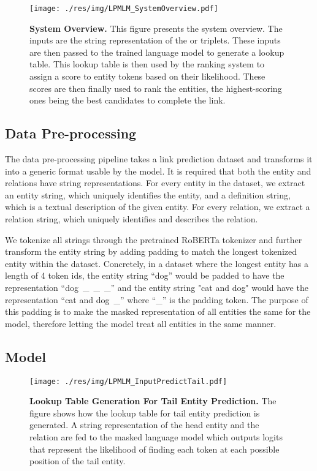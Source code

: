 \documentclass[11pt,a4paper]{article}
\newcommand{\Figure}[4]{\begin{figure}[H]
    \centering
    #1
    \captionsetup{
        labelfont=bf,
        justification=raggedright,
        singlelinecheck=off,
        width=.95\linewidth}
    \caption{\textbf{#3.} #4}
    \label{#2}
\end{figure}}
\begin{document}
\vspace{-1em}

\Figure
{\texttt{[image: ./res/img/LPMLM\_SystemOverview.pdf]}}
{fig:system_overview}
{System Overview}
{This figure presents the system overview.
The inputs are the string representation of the  or  triplets.
These inputs are then passed to the trained language model to generate a lookup table. 
This lookup table is then used by the ranking system to assign a score to entity tokens based on their likelihood. 
These scores are then finally used to rank the entities, the highest-scoring ones being the best candidates to complete the link.
\vspace{-1.5em}
}

\subsection{Data Pre-processing}\label{sec:dataproc}


The data pre-processing pipeline takes a link prediction dataset and transforms it into a generic format usable by the model.
It is required that both the entity and relations have string representations.
For every entity in the dataset, we extract an entity string, which uniquely identifies the entity, and a definition string, which is a textual description of the given entity.
For every relation, we extract a relation string, which uniquely identifies and describes the relation.

We tokenize all strings through the pretrained RoBERTa tokenizer and further transform the entity string by adding padding to match the longest tokenized entity within the dataset.
Concretely, in a dataset where the longest entity has a length of 4 token ids, the entity string ``dog'' would be padded to have the representation ``dog~\_~\_~\_'' and the entity string "cat and dog" would have the representation ``cat and dog~\_'' where ``\_'' is the padding token. 
The purpose of this padding is to make the masked representation of all entities the same for the model, therefore letting the model treat all entities in the same manner.






\subsection{Model}

\Figure
{\texttt{[image: ./res/img/LPMLM\_InputPredictTail.pdf]}}
{fig:input_predict_tail}
{Lookup Table Generation For Tail Entity Prediction}
{The figure shows how the lookup table for tail entity prediction is generated. A string representation of the head entity and the relation are fed to the masked language model which outputs logits that represent the likelihood of finding each token at each possible position of the tail entity.
\vspace{-1em}
}
\end{document}
